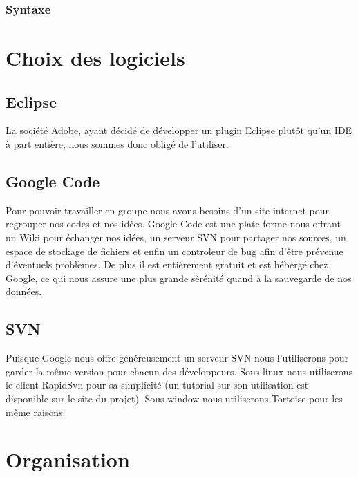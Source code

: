 \documentclass{article}
\begin{document}
		\subsubsection{Syntaxe}

\newpage

\section{Choix des logiciels}
	\subsection{Eclipse}
		La société Adobe, ayant décidé de développer un plugin Eclipse plutôt qu'un IDE à part entière, nous sommes donc obligé de l'utiliser.
	\subsection{Google Code}
		Pour pouvoir travailler en groupe nous avons besoins d'un site internet pour regrouper nos codes et nos idées. Google Code est une plate forme nous offrant un Wiki pour échanger nos idées, un serveur SVN pour partager nos sources, un espace de stockage de fichiers et enfin un controleur de bug afin d'être prévenue d'éventuels problèmes.
		\ident De plus il est entièrement gratuit et est hébergé chez Google, ce qui nous assure une plus grande sérénité quand à la sauvegarde de nos données.
	\subsection{SVN}
		Puisque Google nous offre généreusement un serveur SVN nous l'utiliserons pour garder la même version pour chacun des développeurs. 
		\ident Sous linux nous utiliserons le client RapidSvn pour sa simplicité (un tutorial sur son utilisation est disponible sur le site du projet).
		\ident Sous window nous utiliserons Tortoise pour les même raisons.

\newpage

\section{Organisation}
\end{document}
